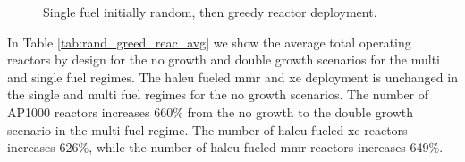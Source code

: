 


\begin{figure}[H]
    \hfill
    \caption{Single fuel initially random, then greedy reactor deployment.}
    \label{fig:rand_greed_of_reactors}
\end{figure}

In Table \ref{tab:rand_greed_reac_avg} we show the average total operating reactors by design for the no growth and double growth scenarios for the multi and single fuel regimes. The \gls{haleu} fueled \gls{mmr} and \gls{xe} deployment is unchanged in the single and multi fuel regimes for the no growth scenarios. The number of AP1000 reactors increases 660\% from the no growth to the double growth scenario in the multi fuel regime. The number of \gls{haleu} fueled \gls{xe} reactors increases 626\%, while the number of \gls{haleu} fueled \gls{mmr} reactors increases 649\%.

